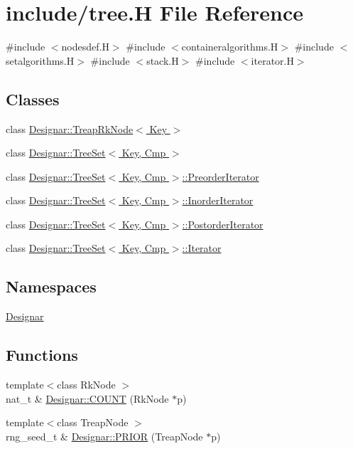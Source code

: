 \hypertarget{tree_8_h}{}\section{include/tree.H File Reference}
\label{tree_8_h}
{\ttfamily \#include $<$nodesdef.\+H$>$}\newline
{\ttfamily \#include $<$containeralgorithms.\+H$>$}\newline
{\ttfamily \#include $<$setalgorithms.\+H$>$}\newline
{\ttfamily \#include $<$stack.\+H$>$}\newline
{\ttfamily \#include $<$iterator.\+H$>$}\newline
\subsection*{Classes}
\begin{DoxyCompactItemize}
\item 
class \hyperlink{class_designar_1_1_treap_rk_node}{Designar\+::\+Treap\+Rk\+Node$<$ Key $>$}
\item 
class \hyperlink{class_designar_1_1_tree_set}{Designar\+::\+Tree\+Set$<$ Key, Cmp $>$}
\item 
class \hyperlink{class_designar_1_1_tree_set_1_1_preorder_iterator}{Designar\+::\+Tree\+Set$<$ Key, Cmp $>$\+::\+Preorder\+Iterator}
\item 
class \hyperlink{class_designar_1_1_tree_set_1_1_inorder_iterator}{Designar\+::\+Tree\+Set$<$ Key, Cmp $>$\+::\+Inorder\+Iterator}
\item 
class \hyperlink{class_designar_1_1_tree_set_1_1_postorder_iterator}{Designar\+::\+Tree\+Set$<$ Key, Cmp $>$\+::\+Postorder\+Iterator}
\item 
class \hyperlink{class_designar_1_1_tree_set_1_1_iterator}{Designar\+::\+Tree\+Set$<$ Key, Cmp $>$\+::\+Iterator}
\end{DoxyCompactItemize}
\subsection*{Namespaces}
\begin{DoxyCompactItemize}
\item 
 \hyperlink{namespace_designar}{Designar}
\end{DoxyCompactItemize}
\subsection*{Functions}
\begin{DoxyCompactItemize}
\item 
{\footnotesize template$<$class Rk\+Node $>$ }\\nat\+\_\+t \& \hyperlink{namespace_designar_a473e1d283b3fd0a75ec0c645eeb7818d}{Designar\+::\+C\+O\+U\+NT} (Rk\+Node $\ast$p)
\item 
{\footnotesize template$<$class Treap\+Node $>$ }\\rng\+\_\+seed\+\_\+t \& \hyperlink{namespace_designar_a0189c4d8fbe8db0c8189d80989a4e9ca}{Designar\+::\+P\+R\+I\+OR} (Treap\+Node $\ast$p)
\end{DoxyCompactItemize}
